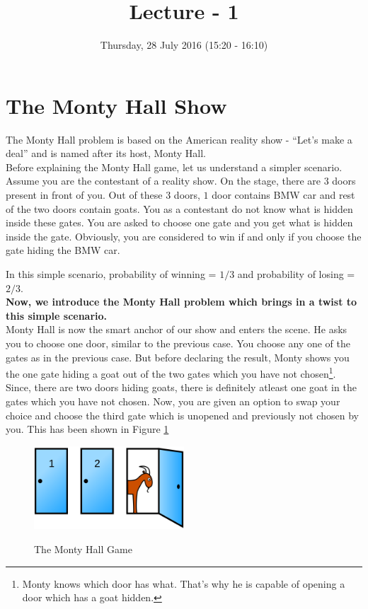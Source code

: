 \documentclass{llncs}
\title{Lecture - 1}
\author{Thursday, 28 July 2016 (15:20 - 16:10)}
\institute{Puzzles : Monty Hall Show, Coin Tossing Game}
\begin{document}
\maketitle
\section{The Monty Hall Show}

The Monty Hall problem is based on the American reality show - ``Let's make a deal'' and is named after its host, Monty Hall. \\

Before explaining the Monty Hall game, let us understand a simpler scenario. Assume you are the contestant of a reality show. On the stage, there are $3$ doors present in front of you. Out of these $3$ doors, $1$ door contains BMW car and rest of the two doors contain goats. You as a contestant do not know what is hidden inside these gates. You are asked to choose one gate and you get what is hidden inside the gate. Obviously, you are considered to win if and only if you choose the gate hiding the BMW car.  

In this simple scenario, probability of winning = $1/3$ and probability of losing = $2/3$.\\

\textbf{Now, we introduce the Monty Hall problem which brings in a twist to this simple scenario.}\\

Monty Hall is now the smart anchor of our show and enters the scene. He asks you to choose one door, similar to the previous case. You choose any one of the gates as in the previous case. But before declaring the result, Monty shows you the one gate hiding a goat out of the two gates which you have not chosen\footnote{Monty knows which door has what. That's why he is capable of opening a door which has a goat hidden.}. Since, there are two doors hiding goats, there is definitely atleast one goat in the gates which you have not chosen. Now, you are given an option to swap your choice and choose the third gate which is unopened and previously not chosen by you. This has been shown in Figure \ref{monty} \\

\begin{figure}[h]
\centering
\includegraphics[width=0.5\textwidth]{monty.png}
\label{monty}
\caption{The Monty Hall Game}
\end{figure}
\end{document}
